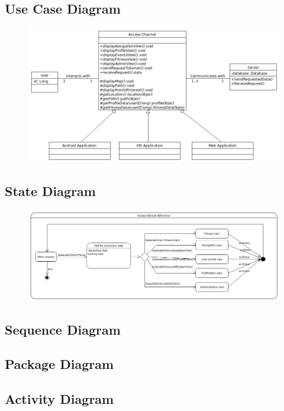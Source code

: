\subsection{Use Case Diagram}
\begin{figure}[ht]
	\includegraphics[width=\textwidth]{Access_Modules/AccessClassDiagramV2.png}
\end{figure}

\subsection{State Diagram}

\begin{figure}[ht]
	\includegraphics[width=\textwidth]{Access_Modules/AccessStateDiagram.png}
\end{figure}

\subsection{Sequence Diagram}

\subsection{Package Diagram}

\subsection{Activity Diagram}

